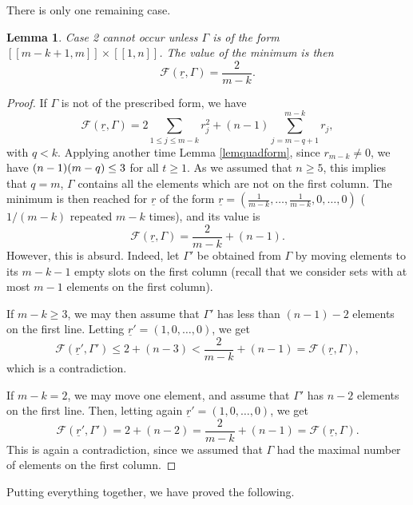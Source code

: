 \documentclass[JEP,XML,SOM,Unicode, NoEqCountersInSection,NoFloatCountersInSection,published]{cedram}
\let\mathcal\mathscr
\newcommand{\llbracket}{[\![}
\newcommand{\rrbracket}{]\!]}
\theoremstyle{theorem}
\newtheorem{lemma}[proposition]{Lemma}
\theoremstyle{definition}
\begin{document}
There is only one remaining case.


\begin{lemma}
Case 2 cannot occur unless $\Gamma$ is of the form $\llbracket m - k + 1, m \rrbracket \times \llbracket 1, n \rrbracket$.
The value of the minimum is then
\[
\mathcal F(\underline{r}, \Gamma) = \frac{2}{m-k}.
\]
\end{lemma}
\begin{proof}
If $\Gamma$ is not of the prescribed form, we have
\[
\mathcal F (\underline{r}, \Gamma) = 2 \sum_{1 \leq j \leq m- k} r_j^2 + (n-1) \sum_{j = m - q + 1}^{m-k} r_j,
\]
with $q < k$. Applying another time Lemma \ref{lemquadform}, since $r_{m-k} \neq 0$, we have $(n-\nobreak 1)(m-\nobreak q) \leq 3$ for all $t \geq 1$. As we assumed that $n \geq 5$, this implies that $q = m$, \ie $\Gamma$ contains all the elements which are not on the first column. The minimum is then reached for $\underline{r}$ of the form $\underline{r} = (\frac{1}{m-k},\dots, \frac{1}{m-k}, 0,\dots, 0)$ ($1/(m-k)$ repeated $m-k$ times), and its value is
\[
\mathcal F (\underline{r}, \Gamma) = \frac{2}{m-k} + (n-1).
\]
However, this is absurd. Indeed, let $\Gamma'$ be obtained from $\Gamma$ by moving elements to its $m - k - 1$ empty slots on the first column (recall that we consider sets with at most $m-1$ elements on the first column).

If $m-k \geq 3$, we may then assume that $\Gamma'$ has less than $(n-1) - 2$ elements on the first line. Letting $\underline{r}' = (1, 0,\dots, 0)$, we get
\[
\mathcal F(\underline{r}', \Gamma') \leq 2 + (n-3) < \frac{2}{m-k} + (n-1) = \mathcal F(\underline{r}, \Gamma),
\]
which is a contradiction.

If $m-k = 2$, we may move one element, and assume that $\Gamma'$ has $n-2$ elements on the first line. Then, letting again $\underline{r}' = (1, 0,\dots, 0)$, we get
\[
\mathcal F(\underline{r}', \Gamma') = 2 + (n-2) = \frac{2}{m-k} + (n-1) = \mathcal F(\underline{r}, \Gamma).
\]
This is again a contradiction, since we assumed that $\Gamma$ had the maximal number of elements on the first column.
\end{proof}

Putting everything together, we have proved the following.
\end{document}
